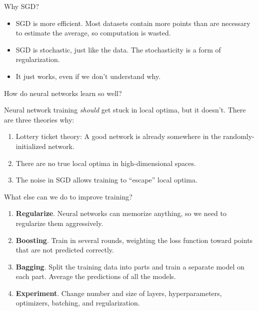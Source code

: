 \documentclass[9pt]{beamer}
\begin{document}
\begin{frame}{Why SGD?}

\addtolength{\itemsep}{0.5\baselineskip}
\begin{itemize}
	\item SGD is more efficient. Most datasets contain more points than are necessary to estimate the average, so computation is wasted.
	\item SGD is stochastic, just like the data. The stochasticity is a form of regularization.
	\item It just works, even if we don't understand why.
\end{itemize}
	
\end{frame}

\begin{frame}{How do neural networks learn so well?}

Neural network training \emph{should} get stuck in local optima, but it doesn't. There are three theories why:
\addtolength{\itemsep}{0.5\baselineskip}
\begin{enumerate}
	\item Lottery ticket theory: A good network is already somewhere in the randomly-initialized network.
	\item There are no true local optima in high-dimensional spaces.
	\item The noise in SGD allows training to ``escape'' local optima.
\end{enumerate}

\end{frame}

\begin{frame}{What else can we do to improve training?}

\addtolength{\itemsep}{0.5\baselineskip}
\begin{enumerate}
	\item \textbf{Regularize}. Neural networks can memorize anything, so we need to regularize them aggressively.
	\item \textbf{Boosting}. Train in several rounds, weighting the loss function toward points that are not predicted correctly.
	\item \textbf{Bagging}. Split the training data into parts and train a separate model on each part. Average the predictions of all the models.
	\item \textbf{Experiment}. Change number and size of layers, hyperparameters, optimizers, batching, and regularization.
\end{enumerate}

\end{frame}
\end{document}
